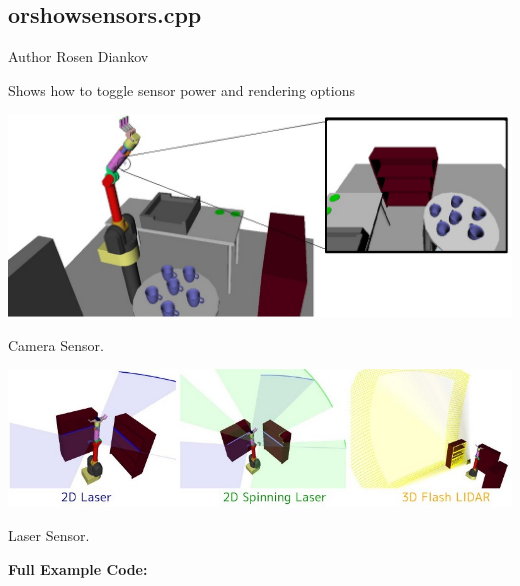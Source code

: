 \hypertarget{orshowsensors.cpp-example}{
\subsection{orshowsensors.cpp}
}
\begin{DoxyAuthor}{Author}
Rosen Diankov
\end{DoxyAuthor}
Shows how to toggle sensor power and rendering options

 
\begin{DoxyImage}
\includegraphics[width=20cm]{showsensors_camera.jpg}
\caption{Camera Sensor.}
\end{DoxyImage}


 
\begin{DoxyImage}
\includegraphics[width=20cm]{showsensors_laser.jpg}
\caption{Laser Sensor.}
\end{DoxyImage}


{\bfseries Full Example Code:}


